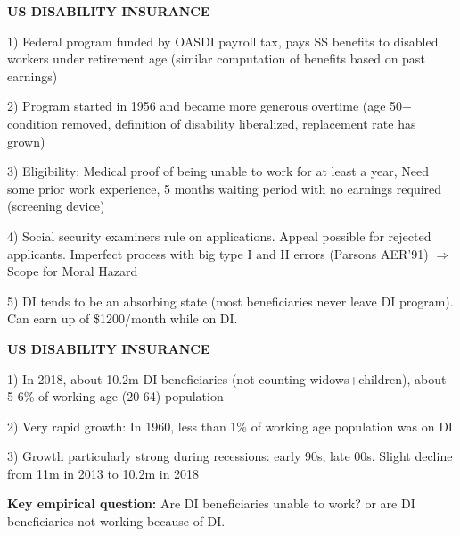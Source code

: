 \documentclass[landscape]{slides}
\begin{document}
\begin{slide}
\begin{center}
{\bf US DISABILITY INSURANCE}
\end{center}
1) Federal program funded by OASDI payroll tax, pays
SS benefits to disabled workers under retirement age (similar computation
of benefits based on past earnings)

2) Program started in 1956 and became more generous overtime
(age 50+ condition removed, definition of disability liberalized,
replacement rate has grown)

3) Eligibility: Medical proof of being unable to work for at least a year,
Need some prior work experience, 5 months waiting period with no earnings
required (screening device)

4) Social security examiners rule on applications. Appeal possible
for rejected applicants. Imperfect process with big type I and II errors
(Parsons AER'91) $\Rightarrow$ Scope for Moral Hazard

5) DI tends to be an absorbing state (most beneficiaries never leave DI program). Can earn up of \$1200/month while on DI.
\end{slide}



\begin{slide}
\begin{center}
{\bf US DISABILITY INSURANCE}
\end{center}
1) In 2018, about 10.2m DI beneficiaries (not counting
widows+children), about 5-6\% of working age (20-64) population

2) Very rapid growth: In 1960, less than 1\% of working age population was on DI

3) Growth particularly strong during recessions: early 90s, late 00s.
Slight decline from 11m in 2013 to 10.2m in 2018

\textbf{Key empirical question:} Are DI beneficiaries unable to work? or are DI beneficiaries
not working because of DI.

\end{slide}


\begin{slide}

\end{slide}
\end{document}
